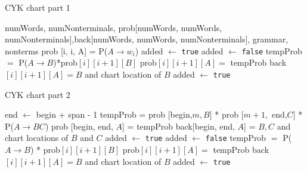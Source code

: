 \documentclass[11pt,twocolumn]{article}
\begin{document}



\nocite{*}

\begin{algorithm*}[!htb]
\caption{CYK chart part 1}
\label{cyk1}
\begin{algorithmic}[1]
\Require numWords, numNonterminals, prob[numWords, numWords, numNonterminals],\newline back[numWords, numWords, numNonterminals], grammar, nonterms
             \State prob [i, i, A] = P($A \rightarrow w_i$)
             \EndIf
		\State added $\gets$ \texttt{true}
			\State added $\gets$ \texttt{false}
					\State tempProb $=$ P($A \rightarrow B$)*prob$[i][i+1][B]$
						\State prob$[i][i+1][A] =$ tempProb
						\State back$[i][i+1] [A] = B$ and chart location of $B$
						\State added $\gets$ \texttt{true}
					\EndIf
				\EndIf
			\EndFor
		\EndWhile
\EndFor
\EndFor
\EndProcedure
{}
\end{algorithmic}
\end{algorithm*}

\begin{algorithm*}[!htb]
\caption{CYK chart part 2}
\label{cyk2}
\begin{algorithmic}[1]
             \State end $\gets$ begin + span - 1
                            \State tempProb = prob [begin,$ m, B]$ * prob $[m + 1,$ end,$ C]$ * P($A \rightarrow BC$) 
                              \State  prob [begin, end, $A$] = tempProb
                              \State  back[begin, end, $A$] = $B, C$ and chart locations of $B$ and $C$
                              \EndIf
				 \State added $\gets$ \texttt{true}
			\State added $\gets$ \texttt{false}
					\State tempProb $=$ P($A \rightarrow B$) * prob$[i][i+1][B]$
						\State prob$[i][i+1][A] =$ tempProb
						\State back$[i][i+1] [A] = B$ and chart location of $B$
						\State added $\gets$ \texttt{true}
					\EndIf
				\EndIf
			\EndFor
		\EndWhile
\EndFor
\EndFor
\EndFor
\EndFor
\EndFor
\EndFor
\EndProcedure
\end{algorithmic}
\end{algorithm*}
\end{document}
